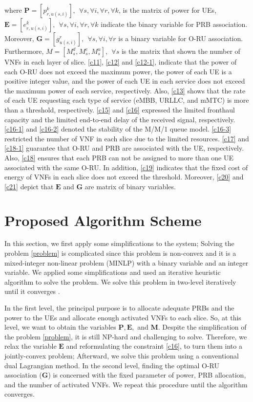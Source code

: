 \documentclass[conference]{IEEEtran}
\begin{document}
where $\boldsymbol{P} =[p_{r,u(s,i)}^{k}], \:\: \forall s , \forall i, \forall r, \forall k $, is the matrix of power for UEs, $\boldsymbol{E} =[e_{r,u(s,i)}^k], \:\: \forall s , \forall i, \forall r, \forall k$ indicate the binary variable for PRB association. Moreover, $\boldsymbol{G} =[g_{u(s,i)}^r], \:\: \forall s , \forall i, \forall r$ is a binary variable for O-RU association. Furthermore, $M = [M_s^d, M_s^c, M_s^u], \:\: \forall s$ is the matrix that shown the number of VNFs in each layer of slice.
\eqref{c11}, \eqref{c12} and \eqref{c12-1}, indicate that the power of each O-RU does not exceed the maximum power, the power of each UE is a positive integer value, and the power of each UE in each service does not exceed the maximum power of each service, respectively.  
Also, \eqref{c13} shows that the rate of each UE requesting each type of service (eMBB, URLLC, and mMTC) is more than a threshold, respectively.
\eqref{c15} and \eqref{c16} expressed the limited fronthaul capacity and the limited end-to-end delay of the received signal, respectively.
\eqref{c16-1} and \eqref{c16-2} denoted the stability of the M/M/1 queue model.
\eqref{c16-3} restricted the number of VNF in each slice due to the limited resources.
\eqref{c17} and \eqref{c18-1} guarantee that O-RU and PRB are associated with the UE, respectively.
Also, \eqref{c18} ensures that each PRB can not be assigned to more than one UE associated with the same O-RU.
In addition, \eqref{c19} indicates that the fixed cost of energy of VNFs in each slice does not exceed the threshold. 
Moreover, \eqref{c20} and \eqref{c21} depict that $\boldsymbol{E}$ and $\boldsymbol{G}$ are matrix of binary variables.
\section{Proposed Algorithm Scheme}\label{proAlg}
In this section, we first apply some simplifications to the system; Solving the problem \eqref{problem} is complicated since this problem is non-convex and it is a  mixed-integer non-linear problem (MINLP) with a binary variable and an integer variable. 
We applied some simplifications and used an iterative heuristic algorithm to solve the problem.
We solve this problem in two-level iteratively until it converges \cite{ali2018joint}.

In the first level, the principal purpose is to allocate adequate PRBs and the power to the UEs and allocate enough activated VNFs
to each slice. So, at this level, we want to obtain the variables $\boldsymbol{P}, \boldsymbol{E},$ and $\boldsymbol{M}$.
Despite the simplification of the problem
\eqref{problem}, it is still NP-hard and challenging to solve. Therefore,
we relax the variable $\boldsymbol{E}$ \cite{lee2018dynamic,ali2018joint} and reformulating the constraint \eqref{c16},
to turn them into a jointly-convex problem; Afterward, we solve this problem using a conventional dual Lagrangian method. 
In the second level, finding the optimal O-RU association ($ \boldsymbol{G}$) is concerned with the fixed parameter of power, PRB allocation, and the number of activated VNFs.   
We repeat this procedure until the algorithm converges.
\end{document}

